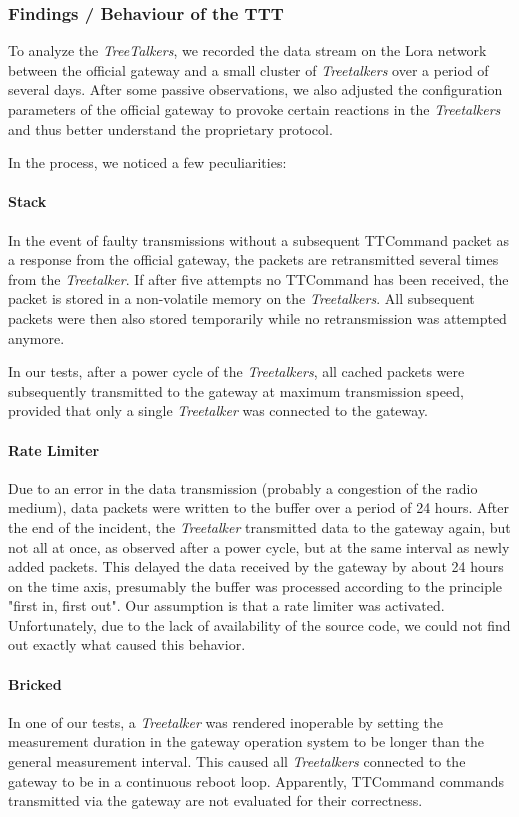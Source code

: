 \subsubsection{Findings / Behaviour of the TTT}
To analyze the \textit{TreeTalkers}, we recorded the data stream on the Lora network between the official gateway and a small cluster of \textit{Treetalkers} over a period of several days. After some passive observations, we also adjusted the configuration parameters of the official gateway to provoke certain reactions in the \textit{Treetalkers} and thus better understand the proprietary protocol.

In the process, we noticed a few peculiarities:

\paragraph{Stack}
In the event of faulty transmissions without a subsequent TTCommand packet as a response from the official gateway, the packets are retransmitted several times from the \textit{Treetalker}. If after five attempts no TTCommand has been received, the packet is stored in a non-volatile memory on the \textit{Treetalkers}. All subsequent packets were then also stored temporarily while no retransmission was attempted anymore.

In our tests, after a power cycle of the \textit{Treetalkers}, all cached packets were subsequently transmitted to the gateway at maximum transmission speed, provided that only a single \textit{Treetalker} was connected to the gateway.

\paragraph{Rate Limiter}
Due to an error in the data transmission (probably a congestion of the radio medium), data packets were written to the buffer over a period of 24 hours. After the end of the incident, the \textit{Treetalker} transmitted data to the gateway again, but not all at once, as observed after a power cycle, but at the same interval as newly added packets. This delayed the data received by the gateway by about 24 hours on the time axis, presumably the buffer was processed according to the principle "first in, first out". Our assumption is that a rate limiter was activated. Unfortunately, due to the lack of availability of the source code, we could not find out exactly what caused this behavior.

\paragraph{Bricked}
In one of our tests, a \textit{Treetalker} was rendered inoperable by setting the measurement duration in the gateway operation system to be longer than the general measurement interval. This caused all \textit{Treetalkers} connected to the gateway to be in a continuous reboot loop. Apparently, TTCommand commands transmitted via the gateway are not evaluated for their correctness. 

